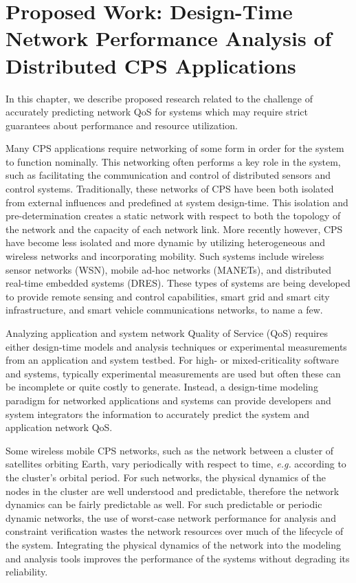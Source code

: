 \chapter{Proposed Work: Design-Time Network Performance Analysis of Distributed CPS Applications}
\label{ch:designTime}

In this chapter, we describe proposed research related to the challenge of accurately predicting network QoS for systems which may require strict guarantees about performance and resource utilization.

Many CPS applications require networking of some form in order for the system to function nominally.  This networking often performs a key role in the system, such as facilitating the communication and control of distributed sensors and control systems.  Traditionally, these networks of CPS have been both isolated from external influences and predefined at system design-time.  This isolation and pre-determination creates a static network with respect to both the topology of the network and the capacity of each network link.
More recently however, CPS have become less isolated and more dynamic by utilizing heterogeneous and wireless networks and incorporating mobility.  Such systems include wireless sensor networks (WSN), mobile ad-hoc networks (MANETs), and distributed real-time embedded systems (DRES).  These types of systems are being developed to provide remote sensing and control capabilities, smart grid and smart city infrastructure, and smart vehicle communications networks, to name a few.  

Analyzing application and system network Quality of Service (QoS) requires either design-time models and analysis techniques or experimental measurements from an application and system testbed.  For high- or mixed-criticality software and systems, typically experimental measurements are used but often these can be incomplete or quite costly to generate.  Instead, a design-time modeling paradigm for networked applications and systems can provide developers and system integrators the information to accurately predict the system and application network QoS.

Some wireless mobile CPS networks, such as the network between a cluster of satellites orbiting Earth, vary periodically with respect to time, \emph{e.g.} according to the cluster's orbital period.  For such networks, the physical dynamics of the nodes in the cluster are well understood and predictable, therefore the network dynamics can be fairly predictable as well.  For such predictable or periodic dynamic networks, the use of worst-case network performance for analysis and constraint verification wastes the network resources over much of the lifecycle of the system. Integrating the physical dynamics of the network into the modeling and analysis tools improves the performance of the systems without degrading its reliability.

